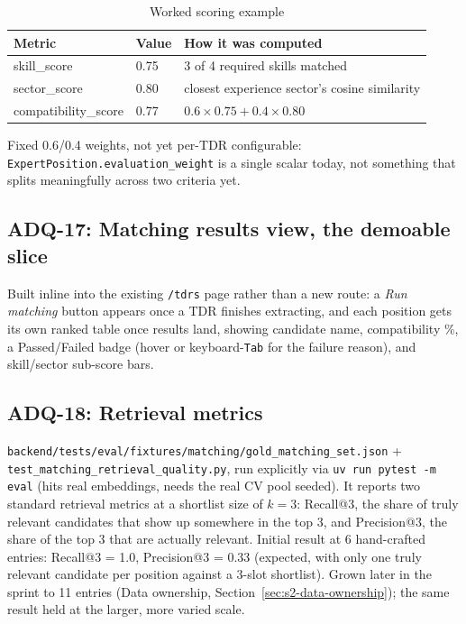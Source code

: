 \begin{table}[H]
  \centering
  \caption{Worked scoring example}
  \label{tab:s2-score-example}
  \begin{tabular}{@{}lll@{}}
    \toprule
    Metric & Value & How it was computed \\
    \midrule
    skill\_score & 0.75 & 3 of 4 required skills matched \\
    sector\_score & 0.80 & closest experience sector's cosine similarity \\
    compatibility\_score & 0.77 & $0.6 \times 0.75 + 0.4 \times 0.80$ \\
    \bottomrule
  \end{tabular}
\end{table}

Fixed 0.6/0.4 weights, not yet per-TDR configurable:
\texttt{ExpertPosition.evaluation\_weight} is a single scalar today, not
something that splits meaningfully across two criteria yet.

\subsection{ADQ-17: Matching results view, the demoable slice}

Built inline into the existing \texttt{/tdrs} page rather than a new
route: a \emph{Run matching} button appears once a TDR finishes
extracting, and each position gets its own ranked table once results
land, showing candidate name, compatibility \%, a Passed/Failed badge
(hover or keyboard-\texttt{Tab} for the failure reason), and skill/sector
sub-score bars.

\subsection{ADQ-18: Retrieval metrics}

\texttt{backend/tests/eval/fixtures/matching/gold\_matching\_set.json} +
\texttt{test\_matching\_retrieval\_quality.py}, run explicitly via
\texttt{uv run pytest -m eval} (hits real embeddings, needs the real CV
pool seeded). It reports two standard retrieval metrics at a shortlist
size of $k=3$: Recall@3, the share of truly relevant candidates that
show up somewhere in the top 3, and Precision@3, the share of the top 3
that are actually relevant. Initial result at 6 hand-crafted entries:
Recall@3 = 1.0, Precision@3 = 0.33 (expected, with only one truly
relevant candidate per position against a 3-slot shortlist). Grown later
in the sprint to 11 entries (Data ownership,
Section~\ref{sec:s2-data-ownership}); the same result held at the
larger, more varied scale.

